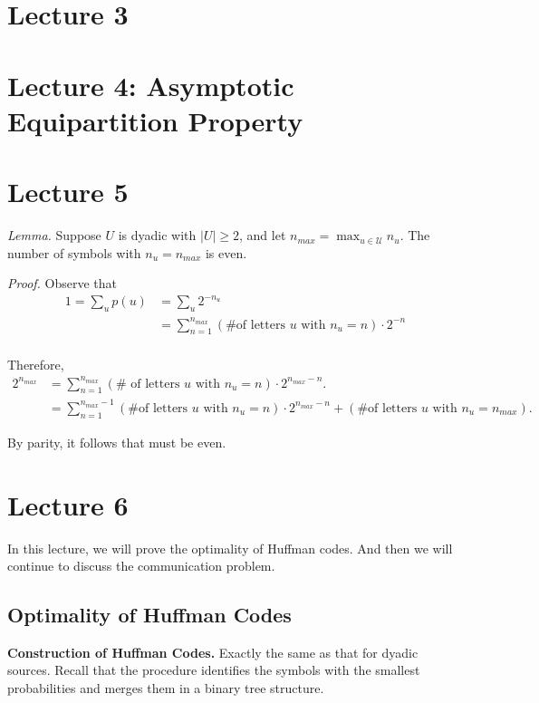 \documentclass[13pt]{article}
\newcommand{\UU}{\mathcal{U}}
\def\UU{\mathcal{U}}
\begin{document}
\section{Lecture 3}
\section{Lecture 4: Asymptotic Equipartition Property}

\section{Lecture 5}

{\it Lemma.} Suppose $U$ is dyadic with $|U| \geq 2$, and let $n_{max} = \max_{u \in \UU} n_u$.  The number of symbols with $n_u = n_{max}$ is even.

{\it Proof.} Observe that
\begin{align*}
  1 = \sum_{u} p(u) &= \sum_{u} 2^{-n_u} \\
  &= \sum_{n=1}^{n_{max}} (\text{\# of letters $u$ with $n_u = n$}) \cdot 2^{-n}  \\
\end{align*}

Therefore,
\begin{align*}
  2^{n_{max}} &= \sum_{n=1}^{n_{max}} (\text{# of letters $u$ with $n_u = n$}) \cdot 2^{n_{max} - n}. \\
  &= \sum_{n=1}^{n_{max}-1} (\text{\# of letters $u$ with $n_u = n$}) \cdot 2^{n_{max} - n} + (\text{\# of letters $u$ with $n_u = n_{max}$}).
\end{align*}

By parity, it follows that  must be even.

\section{Lecture 6}

In this lecture, we will prove the optimality of Huffman codes.  And then we will continue to discuss the communication problem.

\subsection{Optimality of Huffman Codes}
{\bf Construction of Huffman Codes.}  Exactly the same as that for dyadic sources.  Recall that the procedure identifies the symbols with the smallest probabilities and merges them in a binary tree structure.
\end{document}
